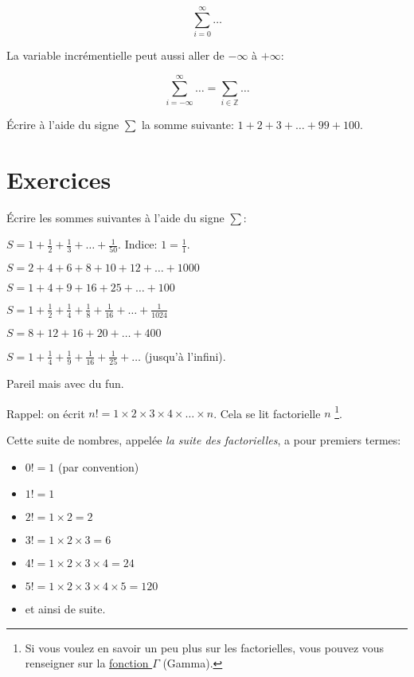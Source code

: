 \documentclass[a4paper,12pt]{scrartcl}
\begin{document}
\begin{equation*}
\sum_{i=0}^{\infty} \ldots
\end{equation*}

La variable incrémentielle peut aussi aller de $-\infty$ à $+\infty$:

\begin{equation*}
\sum_{i=-\infty}^{\infty} \ldots = \sum_{i \in \mathbb{Z}} \ldots
\end{equation*}

\exemple{}
Écrire à l'aide du signe $\sum$ la somme suivante: $1 + 2 + 3 + \ldots + 99 + 100$.


\section*{Exercices}

\exo{}
Écrire les sommes suivantes à l'aide du signe $\sum$:

\question{}
$S = 1 + \frac{1}{2} + \frac{1}{3} + \ldots + \frac{1}{50}$. Indice: $1 = \frac{1}{1}$.

\question{}
$S = 2 + 4 + 6 + 8 + 10 + 12 + \ldots + 1000$

\question{}
$S = 1 + 4 + 9 + 16 + 25 + \ldots + 100$

\question{}
$S = 1 + \frac{1}{2} + \frac{1}{4} + \frac{1}{8} + \frac{1}{16} + \ldots + \frac{1}{1024}$

\question{}
$S = 8 + 12 + 16 + 20 + \ldots + 400$

\question{}
$S = 1 + \frac{1}{4} + \frac{1}{9} + \frac{1}{16} + \frac{1}{25} + \ldots$ (jusqu'à l'infini).

\exo{}
Pareil mais avec du fun.

Rappel: on écrit $n! = 1 \times 2 \times 3 \times 4 \times \ldots \times n$. Cela se lit \og factorielle $n$ \fg{}\footnote{Si vous voulez en savoir un peu plus sur les factorielles, vous pouvez vous renseigner sur la \href{https://fr.wikipedia.org/wiki/Fonction_gamma}{fonction $\Gamma$} (Gamma).}. 

Cette suite de nombres, appelée \emph{la suite des factorielles}, a pour premiers termes:

\begin{itemize}
\item $0! = 1$ (par convention)
\item $1! = 1$
\item $2! = 1 \times 2 = 2$
\item $3! = 1 \times 2 \times 3 = 6$
\item $4! = 1 \times 2 \times 3 \times 4 = 24$
\item $5! = 1 \times 2 \times 3 \times 4 \times 5 = 120$
\item et ainsi de suite.
\end{itemize}
\end{document}
